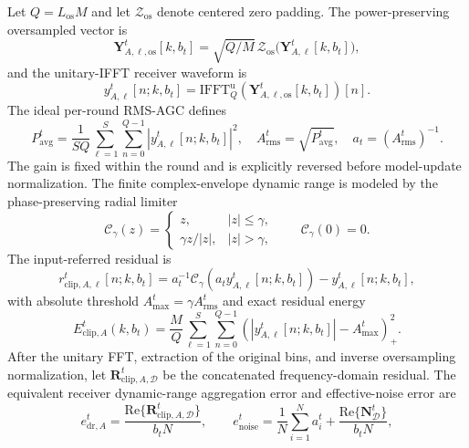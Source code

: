 \documentclass[journal]{IEEEtran}
\begin{document}
Let $Q=L_{\mathrm{os}}M$ and let $\mathcal Z_{\mathrm{os}}$ denote centered zero padding. The power-preserving oversampled vector is
\begin{equation}
    \mathbf Y_{A,\ell,\mathrm{os}}^t[k,b_t]
    =\sqrt{Q/M}\,\mathcal Z_{\mathrm{os}}\big(\mathbf Y_{A,\ell}^t[k,b_t]\big),
\end{equation}
and the unitary-IFFT receiver waveform is
\begin{equation}
    y_{A,\ell}^t[n;k,b_t]
    =\mathrm{IFFT}_{Q}^{\mathrm u}\!\left(\mathbf Y_{A,\ell,\mathrm{os}}^t[k,b_t]\right)[n].
\end{equation}
The ideal per-round RMS-AGC defines
\begin{equation}
    P_{\mathrm{avg}}^t
    =\frac{1}{SQ}\sum_{\ell=1}^{S}\sum_{n=0}^{Q-1}|y_{A,\ell}^t[n;k,b_t]|^2,
    \quad A_{\mathrm{rms}}^t=\sqrt{P_{\mathrm{avg}}^t},
    \quad a_t=(A_{\mathrm{rms}}^t)^{-1}.
\end{equation}
The gain is fixed within the round and is explicitly reversed before model-update normalization. The finite complex-envelope dynamic range is modeled by the phase-preserving radial limiter
\begin{equation}
    \mathcal C_\gamma(z)=
    \begin{cases}
      z,& |z|\le\gamma,\\
      \gamma z/|z|,& |z|>\gamma,
    \end{cases}
    \qquad \mathcal C_\gamma(0)=0.
\end{equation}
The input-referred residual is
\begin{equation}
    r_{\mathrm{clip},A,\ell}^t[n;k,b_t]
    =a_t^{-1}\mathcal C_\gamma\!\left(a_ty_{A,\ell}^t[n;k,b_t]\right)
    -y_{A,\ell}^t[n;k,b_t],
\end{equation}
with absolute threshold $A_{\max}^t=\gamma A_{\mathrm{rms}}^t$ and exact residual energy
\begin{equation}
    \label{eqn:eclip_def}
    E_{\mathrm{clip},A}^t(k,b_t)
    =\frac{M}{Q}\sum_{\ell=1}^{S}\sum_{n=0}^{Q-1}
    \left(|y_{A,\ell}^t[n;k,b_t]|-A_{\max}^t\right)_+^2.
\end{equation}
After the unitary FFT, extraction of the original bins, and inverse oversampling normalization, let $\mathbf R_{\mathrm{clip},A,\mathcal D}^t$ be the concatenated frequency-domain residual. The equivalent receiver dynamic-range aggregation error and effective-noise error are
\begin{equation}
    e_{\mathrm{dr},A}^t
    =\frac{\mathrm{Re}\{\mathbf R_{\mathrm{clip},A,\mathcal D}^t\}}{b_tN},
    \qquad
    e_{\mathrm{noise}}^t
    =\frac1N\sum_{i=1}^{N}a_i^t+\frac{\mathrm{Re}\{\mathbf N_{\mathcal D}^t\}}{b_tN},
\end{equation}
\end{document}

